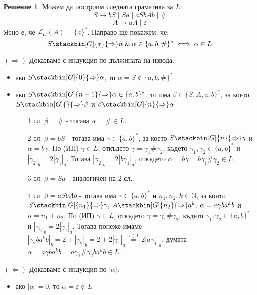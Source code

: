 \documentclass{article}
\theoremstyle{definition}
\newtheorem*{solution}{Решение}
\newcommand{\der}[1]{\stackbin[G]{#1}{\Rightarrow}}
\begin{document}
\begin{solution}
    Можем да построим следната граматика за $L$:
    $$S \rightarrow bS \mid Sa \mid aSbAb \mid \# $$
    $$A \rightarrow aA \mid \varepsilon$$
    Ясно е, че $\mathcal{L}_G(A) = \{ a \}^*$.
    Направо ще покажем, че: $$S \der{*} \alpha \: \& \: \alpha \in \{ a, b, \# \}^* \iff \alpha \in L$$
    \item[$(\Rightarrow)$] Доказваме с индукция по дължината на извода:
    \begin{itemize}
        \item ако $S \der{0} \alpha$, то $\alpha = S \notin \{ a, b, \# \}^*$ \checkmark
        \item ако $S \der{n+1} \alpha \in \{ a, b \}^*$, то има $\beta \in \{S, A, a, b\}^*$, за което $S \der{} \beta$ и $\beta \der{n} \alpha$
              \begin{itemize}
                  \item[1 сл.] $\beta = \#$ - тогава $\alpha = \# \in L$.
                  \item[2 сл.] $\beta = bS$ - тогава има $\gamma \in \{ a, b \}^*$, за което $S \der{n} \gamma$ и $\alpha = b \gamma$.
                      По (ИП) $\gamma \in L$, откъдето $\gamma = \gamma_1 \# \gamma_2$, където $\gamma_1, \gamma_2 \in \{ a, b \}^*$ и $|\gamma_2|_b = 2|\gamma_1|_a$.
                      Тогава $|\gamma_2|_b = 2|b \gamma_1|_a$, откъдето $\alpha = b \gamma = b \gamma_1 \# \gamma_2 \in L$.
                  \item[3 сл.] $\beta = Sa$ - аналогичен на 2 сл.
                  \item[4 сл.] $\beta = aSbAb$ - тогава има $\gamma \in \{ a, b \}^*$ и $n_1, n_2, k \in \mathbb{N}$, за които $S \der{n_1} \gamma, \: A \der{n_2} a^k, \: \alpha = a \gamma b a^k b$ и $n = n_1 + n_2$.
                      По (ИП) $\gamma \in L$, откъдето $\gamma = \gamma_1 \# \gamma_2$, където $\gamma_1, \gamma_2 \in \{ a, b \}^*$ и $|\gamma_2|_b = 2|\gamma_1|_a$.
                      Тогава понеже имаме $|\gamma_2 b a^k b|_b = 2 + |\gamma_2|_b = 2 + 2|\gamma_1|_a \stackrel{\gamma \in L}{=} 2|a \gamma_1|_a$, думата $\alpha = a \gamma b a^k b = a \gamma_1 \# \gamma_2 b a^k b \in L$.
              \end{itemize}
    \end{itemize}
    \item[$(\Leftarrow)$] Доказваме с индукция по $|\alpha|$:
    \begin{itemize}
        \item ако $|\alpha| = 0$, то $\alpha = \varepsilon \notin L$ \checkmark

\end{itemize}
\end{solution}
\end{document}
